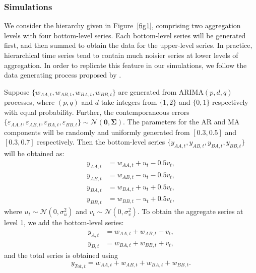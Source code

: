 \documentclass[a4paper, 11pt]{article}
\theoremstyle{theo}
\theoremstyle{definition}
\begin{document}
\subsubsection*{Simulations}

We consider the hierarchy given in Figure~\ref{fig1}, comprising two aggregation levels with four bottom-level series. Each bottom-level series will be generated first, and then summed to obtain the data for the upper-level series. In practice, hierarchical time series tend to contain much noisier series at lower levels of aggregation. In order to replicate this feature in our simulations, we follow the data generating process proposed by \citet{Wickramasuriya2017}.

Suppose $\{w_{AA,t},w_{AB,t},w_{BA,t},w_{BB,t}\}$ are generated from ARIMA$(p,d,q)$ processes, where $(p,q)$ and $d$ take integers from $\{1,2\}$ and $\{0,1\}$ respectively with equal probability. Further, the contemporaneous errors $\{\varepsilon_{AA,t},\varepsilon_{AB,t},\varepsilon_{BA,t},\varepsilon_{BB,t}\} \sim \mathcal{N}(\bm{0}, \bm{\Sigma})$. The parameters for the AR and MA components will be randomly and uniformly generated from $[0.3,0.5]$ and $[0.3,0.7]$ respectively. Then the bottom-level series $\{y_{AA,t},y_{AB,t},y_{BA,t},y_{BB,t}\}$ will be obtained as:
\begin{align*}
y_{AA,t} &= w_{AA,t} + u_t - 0.5v_t,\\
y_{AB,t} &= w_{AB,t} - u_t - 0.5v_t,\\
y_{BA,t} &= w_{BA,t} + u_t + 0.5v_t,\\
y_{BB,t} &= w_{BB,t} - u_t + 0.5v_t,
\end{align*}
where $u_t \sim \mathcal{N}(0,\sigma^2_u)$ and $v_t \sim \mathcal{N}(0,\sigma^2_v)$.
To obtain the aggregate series at level 1, we add the bottom-level series:
\begin{align*}
y_{A,t} &= w_{AA,t} + w_{AB,t} - v_t,\\
y_{B,t} &= w_{BA,t} + w_{BB,t} + v_t,
\end{align*}
and the total series is obtained using
$$y_{Tot,t} = w_{AA,t} + w_{AB,t} + w_{BA,t} + w_{BB,t}.$$
\end{document}
